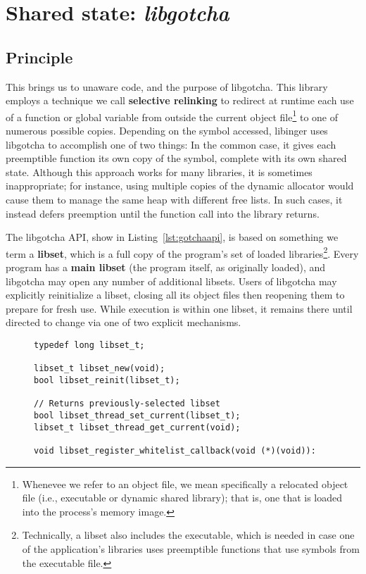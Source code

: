 \section{Shared state: \textit{libgotcha}}
\label{sec:libgotcha}


\subsection{Principle}

This brings us to unaware code, and the purpose of libgotcha.  This library employs
a technique we call \textbf{selective relinking} to redirect at runtime each use of a
function or global variable from outside the current object file\footnote{Whenevee we
refer to an object file, we mean specifically a relocated object file (i.e.,
executable or dynamic shared library); that is, one that is loaded into the process's
memory image.} to one of numerous possible copies.  Depending on the symbol accessed,
libinger uses libgotcha to accomplish one of two things:  In the common case, it
gives each preemptible function its own copy of the symbol, complete with its own
shared state.  Although this approach works for many libraries, it is sometimes
inappropriate; for instance, using multiple copies of the dynamic allocator would
cause them to manage the same heap with different free lists.  In such cases, it
instead defers preemption until the function call into the library returns.

The libgotcha API, show in Listing~\ref{lst:gotchaapi}, is based on something we term
a \textbf{libset}, which is a full copy of the program's set of loaded
libraries\footnote{Technically, a libset also includes the executable, which is
needed in case one of the application's libraries uses preemptible functions that use
symbols from the executable file.}.  Every program has a \textbf{main libset} (the
program itself, as originally loaded), and libgotcha may open any number of
additional libsets.  Users of libgotcha may explicitly reinitialize a libset, closing
all its object files then reopening them to prepare for fresh use.  While execution
is within one libset, it remains there until directed to change via one of two
explicit mechanisms.

\begin{figure}
\begin{lstlisting}[label=lst:gotchaapi,caption=libgotcha C interface]
typedef long libset_t;

libset_t libset_new(void);
bool libset_reinit(libset_t);

// Returns previously-selected libset
bool libset_thread_set_current(libset_t);
libset_t libset_thread_get_current(void);

void libset_register_whitelist_callback(void (*)(void)):
\end{lstlisting}
\end{figure}


